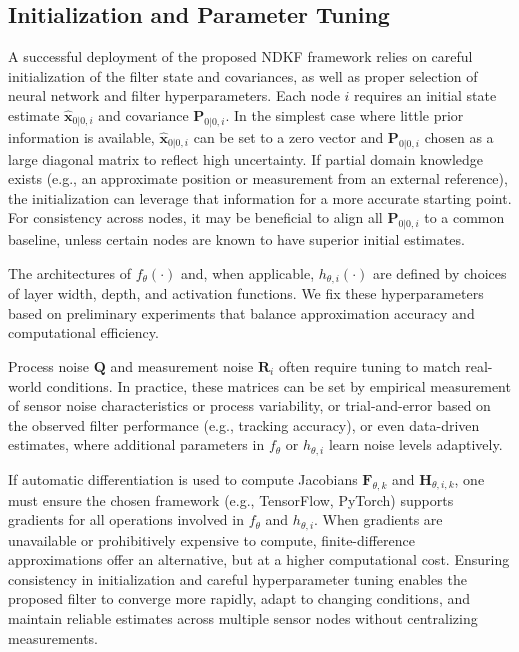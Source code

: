 \documentclass[letterpaper, 10 pt, conference]{ieeeconf}
\begin{document}
\subsection{Initialization and Parameter Tuning}
\label{sec:init-param-tuning}

A successful deployment of the proposed NDKF framework relies on careful initialization of the filter state and covariances, as well as proper selection of neural network and filter hyperparameters.
Each node $i$ requires an initial state estimate $\hat{\mathbf{x}}_{0|0,i}$ and covariance $\mathbf{P}_{0|0,i}$. In the simplest case where little prior information is available, $\hat{\mathbf{x}}_{0|0,i}$ can be set to a zero vector and $\mathbf{P}_{0|0,i}$ chosen as a large diagonal matrix to reflect high uncertainty. If partial domain knowledge exists (e.g., an approximate position or measurement from an external reference), the initialization can leverage that information for a more accurate starting point. For consistency across nodes, it may be beneficial to align all $\mathbf{P}_{0|0,i}$ to a common baseline, unless certain nodes are known to have superior initial estimates.

The architectures of $f_{\theta}(\cdot)$ and, when applicable, $h_{\theta,i}(\cdot)$ are defined by choices of layer width, depth, and activation functions. We fix these hyperparameters based on preliminary experiments that balance approximation accuracy and computational efficiency.

Process noise $\mathbf{Q}$ and measurement noise $\mathbf{R}_i$ often require tuning to match real-world conditions. In practice, these matrices can be set by empirical measurement of sensor noise characteristics or process variability, or trial-and-error based on the observed filter performance (e.g., tracking accuracy), or even data-driven estimates, where additional parameters in $f_{\theta}$ or $h_{\theta,i}$ learn noise levels adaptively.

If automatic differentiation is used to compute Jacobians $\mathbf{F}_{\theta,k}$ and $\mathbf{H}_{\theta,i,k}$, one must ensure the chosen framework (e.g., TensorFlow, PyTorch) supports gradients for all operations involved in $f_{\theta}$ and $h_{\theta,i}$. When gradients are unavailable or prohibitively expensive to compute, finite-difference approximations offer an alternative, but at a higher computational cost.
Ensuring consistency in initialization and careful hyperparameter tuning enables the proposed filter to converge more rapidly, adapt to changing conditions, and maintain reliable estimates across multiple sensor nodes without centralizing measurements.
\end{document}
